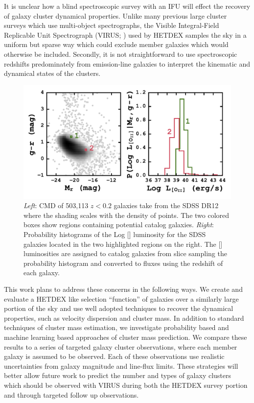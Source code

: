 \documentclass[fleqn,usenatbib]{mnras}
\begin{document}
It is unclear how a blind spectroscopic survey with an IFU will effect the recovery of galaxy cluster dynamical properties. Unlike many previous large cluster surveys  which use multi-object spectrographs, the Visible Integral-Field Replicable Unit Spectrograph (VIRUS; \citealt{Hill2012}) used by HETDEX samples the sky in a uniform but sparse way which could exclude member galaxies which would otherwise be included. Secondly, it is not straightforward to use spectroscopic redshifts predominately from emission-line galaxies to interpret the kinematic and dynamical states of the clusters.

\begin{figure}
	\includegraphics[width=\textwidth]{figures/oii_sdss.pdf} 
	\caption{\textit{Left}: CMD of 503,113 $z<0.2$ galaxies take from the SDSS DR12 where the shading scales with the density of points. The two colored boxes show regions containing potential catalog galaxies. \textit{Right}: Probability histograms of the Log \hbox{[]} luminosity for the SDSS galaxies located in the two highlighted regions on the right. The \hbox{[]} luminosities are assigned to catalog galaxies from slice sampling the probability histogram and converted to fluxes using the redshift of each galaxy.}
	\label{fig: oii sdss} 
\end{figure}

This work plans to address these concerns in the following ways. We create and evaluate a HETDEX like selection ``function'' of galaxies over a similarly large portion of the sky and use well adopted techniques to recover the dynamical properties, such as velocity dispersion and cluster mass. In addition to standard techniques of cluster mass estimation, we investigate probability based and machine learning based approaches of cluster mass prediction. We compare these results to a series of targeted galaxy cluster observations, where each member galaxy is assumed to be observed. Each of these observations use realistic uncertainties from galaxy magnitude and line-flux limits. These strategies will better allow future work to predict the number and types of galaxy clusters which should be observed with VIRUS during both the HETDEX survey portion and through targeted follow up observations.
\end{document}
